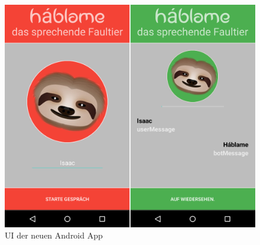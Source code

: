 	\begin{figure}[htbp]
		\centering
		\includegraphics[width=1.0\linewidth]{dh/graphics/hablame-new.png}
		\caption{UI der neuen Android App}
		\label{fig:hablame-new}
	\end{figure}